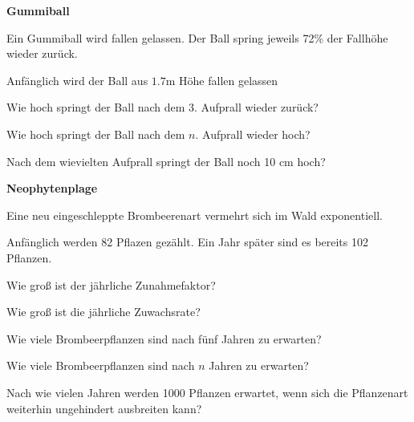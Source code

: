 

\bbwActAufgabenNr{} \textbf{Gummiball}

Ein Gummiball wird fallen gelassen. Der Ball spring jeweils 72\% der Fallhöhe wieder zurück.

Anfänglich wird der Ball aus $1.7 \textrm{m}$ Höhe fallen gelassen

\begin{bbwAufgabenBlock}

\item Wie hoch springt der Ball nach dem 3. Aufprall wieder zurück?
\item Wie hoch springt der Ball nach dem $n$. Aufprall wieder hoch?
\item Nach dem wievielten Aufprall springt der Ball noch 10 cm hoch?
\end{bbwAufgabenBlock}
\platzFuerBerechnungenBisEndeSeite{}






\bbwActAufgabenNr{} \textbf{Neophytenplage}

Eine neu eingeschleppte Brombeerenart vermehrt sich im Wald exponentiell.

Anfänglich werden 82 Pflazen gezählt. Ein Jahr später sind es bereits 102 Pflanzen.

\begin{bbwAufgabenBlock}

\item Wie groß ist der jährliche Zunahmefaktor?
\item Wie groß ist die jährliche Zuwachsrate?
      
\item Wie viele Brombeerpflanzen sind nach fünf Jahren zu erwarten?

\item Wie viele Brombeerpflanzen sind nach $n$ Jahren zu erwarten?
\item Nach wie vielen Jahren werden 1000 Pflanzen erwartet, wenn sich die Pflanzenart weiterhin ungehindert ausbreiten kann?
\end{bbwAufgabenBlock}
\platzFuerBerechnungenBisEndeSeite{}



